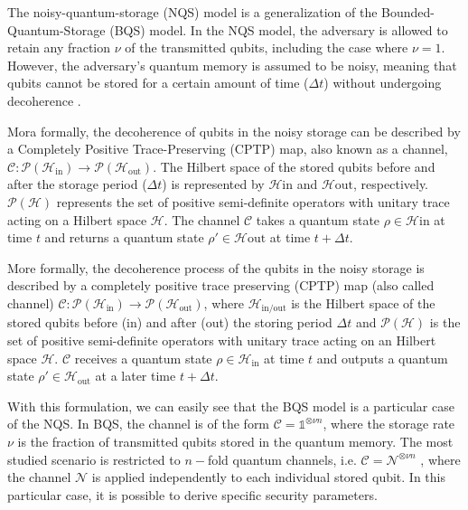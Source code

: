 The noisy-quantum-storage (NQS) model is a generalization of the Bounded-Quantum-Storage (BQS) model. In the NQS model, the adversary is allowed to retain any fraction $\nu$ of the transmitted qubits, including the case where $\nu = 1$. However, the adversary's quantum memory is assumed to be noisy, meaning that qubits cannot be stored for a certain amount of time ($\Delta t$) without undergoing decoherence \cite{KWW12}. 



Mora formally, the decoherence of qubits in the noisy storage can be described by a Completely Positive Trace-Preserving (CPTP) map, also known as a channel, $\mathcal{C}: \mathcal{P}(\mathcal{H}_{\text{in}}) \rightarrow \mathcal{P}(\mathcal{H}_{\text{out}})$. The Hilbert space of the stored qubits before and after the storage period ($\Delta t$) is represented by $\mathcal{H}{\text{in}}$ and $\mathcal{H}{\text{out}}$, respectively. $\mathcal{P}(\mathcal{H})$ represents the set of positive semi-definite operators with unitary trace acting on a Hilbert space $\mathcal{H}$. The channel $\mathcal{C}$ takes a quantum state $\rho\in\mathcal{H}{\text{in}}$ at time $t$ and returns a quantum state $\rho'\in\mathcal{H}{\text{out}}$ at time $t + \Delta t$.


More formally, the decoherence process of the qubits in the noisy storage is described by a completely positive trace preserving (CPTP) map (also called channel) $\mathcal{C}: \mathcal{P}(\mathcal{H}_{\text{in}})\rightarrow \mathcal{P}(\mathcal{H}_{\text{out}})$, where $\mathcal{H}_{\text{in/out}}$ is the Hilbert space of the stored qubits before (in) and after (out) the storing period $\Delta t$ and $\mathcal{P}(\mathcal{H})$ is the set of positive semi-definite operators with unitary trace acting on an Hilbert space $\mathcal{H}$. $\mathcal{C}$ receives a quantum state $\rho\in \mathcal{H}_{\text{in}}$ at time $t$ and outputs a quantum state $\rho'\in\mathcal{H}_{\text{out}}$ at a later time $t + \Delta t$. %


With this formulation, we can easily see that the BQS model is a particular case of the NQS. In BQS, the channel is of the form $\mathcal{C} = \mathds{1}^{\otimes \nu n}$, where the storage rate $\nu$ is the fraction of transmitted qubits stored in the quantum memory. The most studied scenario is restricted to $n-$fold quantum channels, i.e. $\mathcal{C} = \mathcal{N}^{\otimes \nu n}$ \cite{S10, KWW12, WST08}, where the channel $\mathcal{N}$ is applied independently to each individual stored qubit. In this particular case, it is possible to derive specific security parameters.

